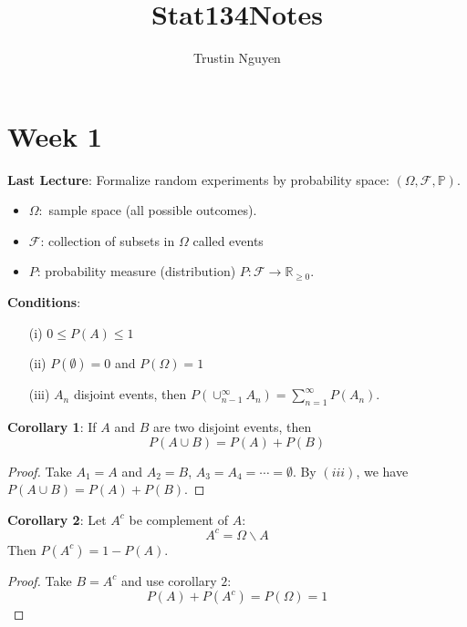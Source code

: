\documentclass{report}
\title{Stat134Notes}
\author{Trustin Nguyen}
\begin{document}
\begin{titlepage}
    \maketitle
\end{titlepage}

\tableofcontents
\restoregeometry

\reversemarginpar

\chapter{Week 1}

\textbf{Last Lecture}: Formalize random experiments by probability space: $(\Omega, \mathcal{F}, \mathbb{P})$. 
    \begin{itemize}
        \item $\Omega:$ sample space (all possible outcomes).

        \item $\mathcal{F}$: collection of subsets in $\Omega$ called events

        \item $P$: probability measure (distribution) $P : \mathcal{F} \rightarrow \mathbb{R}_{\geq 0}$. 
    \end{itemize}
\textbf{Conditions}:
    \begin{itemize}
        \item [(i)] $0 \leq P(A) \leq 1$

        \item [(ii)] $P(\emptyset)  = 0$ and $P(\Omega) = 1$

        \item [(iii)] $A_{n}$ disjoint events, then $P(\cup_{n - 1}^{\infty}A_{n}) = \sum_{n = 1}^{\infty}P(A_{n})$.
    \end{itemize}

\textbf{Corollary 1}: If $A$ and $B$ are two disjoint events, then 
    \begin{equation*}
        P(A \cup B) = P(A) + P(B)
    \end{equation*}
    \begin{proof}
        Take $A_{1} = A$ and $A_{2} = B$, $A_{3} = A_{4} = \cdots = \emptyset$. By $(iii)$, we have $P(A \cup B) = P(A) + P(B)$.
    \end{proof}

\textbf{Corollary 2}: Let $A^{c}$ be complement of $A$:
    \begin{equation*}
        A^{c} = \Omega \backslash A
    \end{equation*}
Then $P(A^{c}) = 1 - P(A)$. 
    \begin{proof}
        Take $B = A^{c}$ and use corollary $2$:
            \begin{equation*}
                P(A) + P(A^{c}) = P(\Omega) = 1
            \end{equation*}
    \end{proof}
\end{document}
